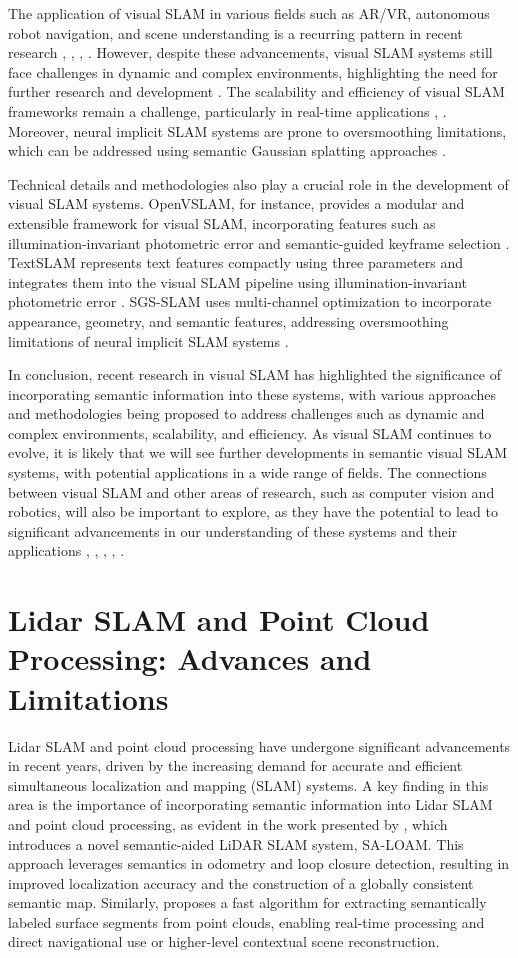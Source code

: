 \documentclass[conference]{IEEEtran}
\begin{document}
The application of visual SLAM in various fields such as AR/VR, autonomous robot navigation, and scene understanding is a recurring pattern in recent research \cite{b1}, \cite{b2}, \cite{b3}, \cite{b4}. However, despite these advancements, visual SLAM systems still face challenges in dynamic and complex environments, highlighting the need for further research and development \cite{b1}. The scalability and efficiency of visual SLAM frameworks remain a challenge, particularly in real-time applications \cite{b2}, \cite{b4}. Moreover, neural implicit SLAM systems are prone to oversmoothing limitations, which can be addressed using semantic Gaussian splatting approaches \cite{b5}.

Technical details and methodologies also play a crucial role in the development of visual SLAM systems. OpenVSLAM, for instance, provides a modular and extensible framework for visual SLAM, incorporating features such as illumination-invariant photometric error and semantic-guided keyframe selection \cite{b2}. TextSLAM represents text features compactly using three parameters and integrates them into the visual SLAM pipeline using illumination-invariant photometric error \cite{b3}. SGS-SLAM uses multi-channel optimization to incorporate appearance, geometry, and semantic features, addressing oversmoothing limitations of neural implicit SLAM systems \cite{b5}.

In conclusion, recent research in visual SLAM has highlighted the significance of incorporating semantic information into these systems, with various approaches and methodologies being proposed to address challenges such as dynamic and complex environments, scalability, and efficiency. As visual SLAM continues to evolve, it is likely that we will see further developments in semantic visual SLAM systems, with potential applications in a wide range of fields. The connections between visual SLAM and other areas of research, such as computer vision and robotics, will also be important to explore, as they have the potential to lead to significant advancements in our understanding of these systems and their applications \cite{b1}, \cite{b2}, \cite{b3}, \cite{b4}, \cite{b5}.

\section{Lidar SLAM and Point Cloud Processing: Advances and Limitations}
Lidar SLAM and point cloud processing have undergone significant advancements in recent years, driven by the increasing demand for accurate and efficient simultaneous localization and mapping (SLAM) systems. A key finding in this area is the importance of incorporating semantic information into Lidar SLAM and point cloud processing, as evident in the work presented by \cite{b1}, which introduces a novel semantic-aided LiDAR SLAM system, SA-LOAM. This approach leverages semantics in odometry and loop closure detection, resulting in improved localization accuracy and the construction of a globally consistent semantic map. Similarly, \cite{b2} proposes a fast algorithm for extracting semantically labeled surface segments from point clouds, enabling real-time processing and direct navigational use or higher-level contextual scene reconstruction.
\end{document}

